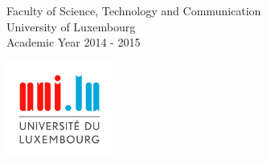 \begin{center}
  \vspace*{1.0cm}

  \begin{minipage}{0.7\textwidth}
  {Faculty of Science, Technology and Communication\\
  	      University of Luxembourg \\
	Academic Year 2014 - 2015}
  \end{minipage} \hfill
  \begin{minipage}{0.25\textwidth}
   \includegraphics[width=3.5cm, keepaspectratio=true]{logo-UL}
  \end{minipage}

\end{center}
